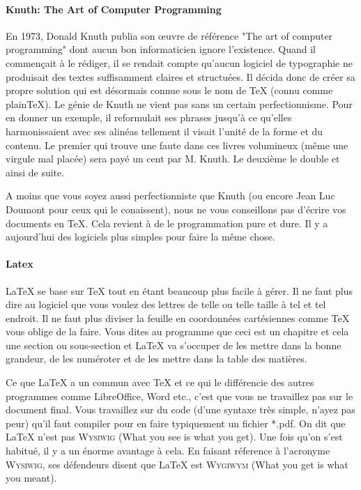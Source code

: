 




\vspace{.6cm}
\paragraph{Knuth: The Art of Computer Programming}
En 1973, Donald Knuth publia son \oe uvre de référence "The art of computer programming" dont aucun bon informaticien ignore l'existence. Quand il commençait à le rédiger, il se rendait compte qu'aucun logiciel de typographie ne produisait des textes suffisamment claires et structuées. Il décida donc de créer sa propre solution qui est désormais connue sous le nom de \TeX{} (connu comme plain\TeX). Le génie de Knuth ne vient pas sans un certain perfectionnisme. Pour en donner un exemple, il reformulait ses phrases jusqu'à ce qu'elles harmonissaient avec ses alinéas tellement il visait l'unité de la forme et du contenu.
Le premier qui trouve une faute dans ces livres volumineux (même une virgule mal placée) sera payé un cent par M. Knuth. Le deuxième le double et ainsi de suite.

A moins que vous soyez aussi perfectionniste que Knuth (ou encore Jean Luc Doumont pour ceux qui le conaissent), nous ne vous conseillons pas d'écrire vos documents en \TeX. Cela revient à de le programmation pure et dure. Il y a aujourd'hui des logiciels plus simples pour faire la même chose.

\paragraph{Latex}
\LaTeX{} se base sur \TeX{} tout en étant beaucoup plus facile à gérer. Il ne faut plus dire au logiciel que vous voulez des lettres de telle ou telle taille à tel et tel endroit. Il ne faut plus diviser la feuille en coordonnées cartésiennes comme \TeX{} vous oblige de la faire. Vous dites au programme que ceci est un chapitre et cela une section ou sous-section et \LaTeX{} va s'occuper de les mettre dans la bonne grandeur, de les numéroter et de les mettre dans la table des matières.

Ce que \LaTeX{} a un commun avec \TeX{} et ce qui le différencie des autres programmes comme LibreOffice, Word etc., c'est que vous ne travaillez pas sur le document final. Vous travaillez sur du code (d'une syntaxe très simple, n'ayez pas peur) qu'il faut compiler pour en faire typiquement un fichier *.pdf. On dit que \LaTeX{} n'est pas \textsc{Wysiwig} (What you see is what you get). Une fois qu'on s'est habitué, il y a un énorme avantage à cela. En faisant réference à l'acronyme \textsc{Wysiwig}, ses défendeurs disent que \LaTeX{} est \textsc{Wygiwym} (What you get is what you meant).

